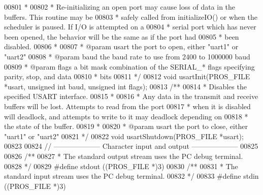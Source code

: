 \begin{DoxyCode}
00801 \textcolor{comment}{ *}
00802 \textcolor{comment}{ * Re-initializing an open port may cause loss of data in the buffers. This routine may be}
00803 \textcolor{comment}{ * safely called from initializeIO() or when the scheduler is paused. If I/O is attempted on a}
00804 \textcolor{comment}{ * serial port which has never been opened, the behavior will be the same as if the port had}
00805 \textcolor{comment}{ * been disabled.}
00806 \textcolor{comment}{ *}
00807 \textcolor{comment}{ * @param usart the port to open, either "uart1" or "uart2"}
00808 \textcolor{comment}{ * @param baud the baud rate to use from 2400 to 1000000 baud}
00809 \textcolor{comment}{ * @param flags a bit mask combination of the SERIAL\_* flags specifying parity, stop, and data}
00810 \textcolor{comment}{ * bits}
00811 \textcolor{comment}{ */}
00812 \textcolor{keywordtype}{void} usartInit(PROS_FILE *usart, \textcolor{keywordtype}{unsigned} \textcolor{keywordtype}{int} baud, \textcolor{keywordtype}{unsigned} \textcolor{keywordtype}{int} flags);
00813 \textcolor{comment}{/**}
00814 \textcolor{comment}{ * Disables the specified USART interface.}
00815 \textcolor{comment}{ *}
00816 \textcolor{comment}{ * Any data in the transmit and receive buffers will be lost. Attempts to read from the port}
00817 \textcolor{comment}{ * when it is disabled will deadlock, and attempts to write to it may deadlock depending on}
00818 \textcolor{comment}{ * the state of the buffer.}
00819 \textcolor{comment}{ *}
00820 \textcolor{comment}{ * @param usart the port to close, either "uart1" or "uart2"}
00821 \textcolor{comment}{ */}
00822 \textcolor{keywordtype}{void} usartShutdown(PROS_FILE *usart);
00823 
00824 \textcolor{comment}{// -------------------- Character input and output --------------------}
00825 
00826 \textcolor{comment}{/**}
00827 \textcolor{comment}{ * The standard output stream uses the PC debug terminal.}
00828 \textcolor{comment}{ */}
00829 \textcolor{preprocessor}{#}\textcolor{preprocessor}{define} \textcolor{preprocessor}{stdout} \textcolor{preprocessor}{(}\textcolor{preprocessor}{(}\textcolor{preprocessor}{PROS\_FILE} \textcolor{preprocessor}{*}\textcolor{preprocessor}{)}3\textcolor{preprocessor}{)}
00830 \textcolor{comment}{/**}
00831 \textcolor{comment}{ * The standard input stream uses the PC debug terminal.}
00832 \textcolor{comment}{ */}
00833 \textcolor{preprocessor}{#}\textcolor{preprocessor}{define} \textcolor{preprocessor}{stdin} \textcolor{preprocessor}{(}\textcolor{preprocessor}{(}\textcolor{preprocessor}{PROS\_FILE} \textcolor{preprocessor}{*}\textcolor{preprocessor}{)}3\textcolor{preprocessor}{)}

\end{DoxyCode}
